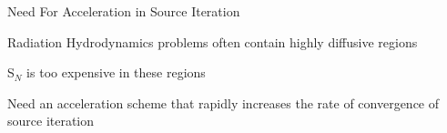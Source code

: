 \documentclass[10pt]{beamer}
\newcommand{\SN}{S$_N$\xspace}
\begin{document}
\begin{frame}{Need For Acceleration in Source Iteration}

	Radiation Hydrodynamics problems often contain highly diffusive regions 

	\SN is too expensive in these regions 

	Need an \alert{acceleration scheme} that rapidly increases the rate of convergence of source iteration 

\end{frame}












\end{document}
